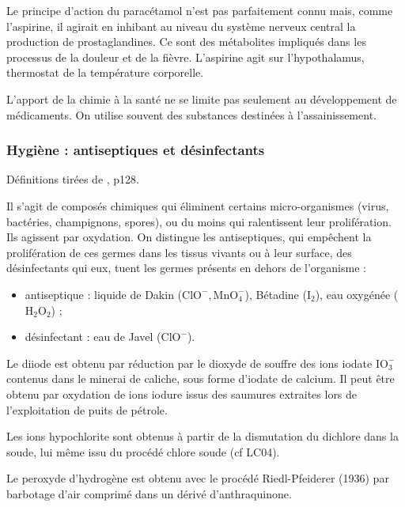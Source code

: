 \begin{remarque}
Le principe d'action du paracétamol n'est pas parfaitement connu mais, comme l'aspirine, il agirait en inhibant au niveau du système nerveux central la production de prostaglandines.
Ce sont des métabolites impliqués dans les processus de la douleur et de la fièvre.
L'aspirine agit sur l'hypothalamus, thermostat de la température corporelle.
\end{remarque}

\begin{transition}
L'apport de la chimie à la santé ne se limite pas seulement au développement de médicaments.
On utilise souvent des substances destinées à l'assainissement.
\end{transition}

\subsubsection{Hygiène : antiseptiques et désinfectants}

Définitions tirées de \cite{Azan2011}, p128.

Il s'agit de composés chimiques qui éliminent certains micro-organismes (virus, bactéries, champignons, spores), ou du moins qui ralentissent leur prolifération.
Ils agissent par oxydation.
On distingue les antiseptiques, qui empêchent la prolifération de ces germes dans les tissus vivants ou à leur surface, des désinfectants qui eux, tuent les germes présents en dehors de l'organisme :
\begin{itemize}
\item antiseptique : liquide de Dakin ($\mathrm{ClO^-, MnO_4^-}$), Bétadine ($\mathrm{I_2}$), eau oxygénée ($\mathrm{H_2O_2}$) ;
\item désinfectant : eau de Javel ($\mathrm{ClO^-}$).
\end{itemize}

\begin{remarque}
Le diiode est obtenu par réduction par le dioxyde de souffre des ions iodate $\mathrm{IO_3^-}$ contenus dans le minerai de caliche, sous forme d'iodate de calcium.
Il peut être obtenu par oxydation de ions iodure issus des saumures extraites lors de l'exploitation de puits de pétrole.

\noindent
Les ions hypochlorite sont obtenus à partir de la dismutation du dichlore dans la soude, lui même issu du procédé chlore soude (cf LC04).

\noindent
Le peroxyde d'hydrogène est obtenu avec le procédé Riedl-Pfeiderer (1936) par barbotage d'air comprimé dans un dérivé d'anthraquinone.
\end{remarque}


